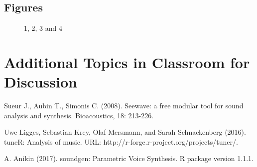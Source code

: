 \subsection{Figures}

\begin{figure}[H]
	\centering
	\begin{minipage}[b]{0.5\linewidth}
	\end{minipage}\hfill
	\begin{minipage}[b]{0.5\linewidth}
	\end{minipage}\hfill	
	\begin{minipage}[b]{0.5\linewidth}
	\end{minipage}\hfill
	\begin{minipage}[b]{0.5\linewidth}
	\end{minipage}\hfill
	\caption{1, 2, 3 and 4}
	\label{fig:Figure1}
\end{figure} 


\section{Additional Topics in Classroom for Discussion}

\begin{enumerate}
\end{enumerate}



\begin{thebibliography}{00}

Sueur J., Aubin T., Simonis C. (2008). 
\newblock Seewave: a free modular tool for sound analysis and synthesis. 
\newblock Bioacoustics, 18: 213-226.

Uwe Ligges, Sebastian Krey, Olaf Mersmann, and Sarah Schnackenberg (2016). 
\newblock tuneR: Analysis of music. 
\newblock URL: http://r-forge.r-project.org/projects/tuner/.

A. Anikin (2017). 
\newblock soundgen: Parametric Voice Synthesis. 
\newblock R package version 1.1.1.

\end{thebibliography}


